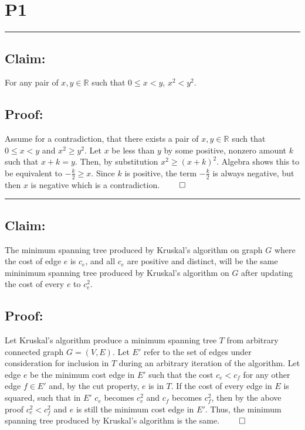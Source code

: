 \documentclass[11pt]{article}
\title{}
\author{}
\date{}
\newcommand{\R}{\mathbb{R}}
\begin{document}
\section*{P1}

\noindent\textcolor[RGB]{220,220,220}{\rule{\linewidth}{0.8pt}}

\subsection*{Claim:} 

For any pair of $x, y \in \R$ such that $0 \leq x < y$, $x^2 < y^2$.

\subsection*{Proof:}

Assume for a contradiction, that there exists a pair of $x, y \in \R$ such that $0 \leq x < y$ and $x^2 \geq y^2$. Let $x$ be less than $y$ by some positive, nonzero amount $k$ such that $x + k = y$. Then, by substitution $x^2 \geq (x + k)^2$. Algebra shows this to be equivalent to $-\frac{k}{2} \geq x$. Since $k$ is positive, the term $-\frac{k}{2}$ is always negative, but then $x$ is negative which is a contradiction. $\qed$

\noindent\textcolor[RGB]{220,220,220}{\rule{\linewidth}{0.8pt}}

\subsection*{Claim:} 

The minimum spanning tree produced by Kruskal's algorithm on graph $G$ where the cost of edge $e$ is $c_e$, and all $c_e$ are positive and distinct, will be the same mininimum spanning tree produced by Kruskal's algorithm on $G$ after updating the cost of every $e$ to $c_e^2$.

\subsection*{Proof:}

Let Kruskal's algorithm produce a minimum spanning tree $T$ from arbitrary connected graph $G = (V, E)$. Let $E'$ refer to the set of edges under consideration for inclusion in $T$ during an arbitrary iteration of the algorithm. Let edge $e$ be the minimum cost edge in $E'$ such that the cost $c_e < c_f$ for any other edge $f \in E'$ and, by the cut property, $e$ is in $T$. If the cost of every edge in $E$ is squared, such that in $E'$ $c_e$ becomes $c_e^2$ and $c_f$ becomes $c_f^2$, then by the above proof $c_e^2 < c_f^2$ and $e$ is still the minimum cost edge in $E'$. Thus, the minimum spanning tree produced by Kruskal's algorithm is the same. $\qed$
\end{document}
